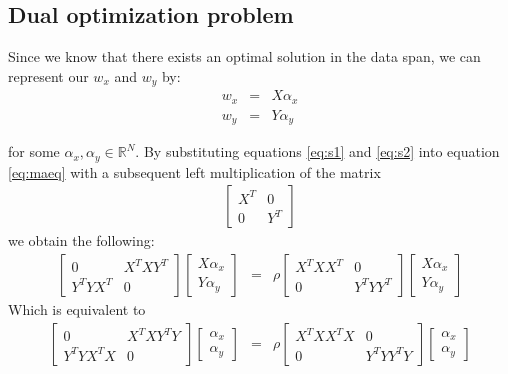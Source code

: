 \documentclass[a4paper, 12pt, titlepage]{article}
\begin{document}
\subsection{Dual optimization problem}
Since we know that there exists an optimal solution in the data span, we can represent our $w_x$ and $w_y$ by:
\begin{eqnarray}
	w_x &=& X\alpha_x \label{eq:s1}\\
	w_y &=& Y\alpha_y \label{eq:s2}
\end{eqnarray}

for some $\alpha_x, \alpha_y \in \mathbb{R}^{N}$.
By substituting equations \eqref{eq:s1} and \eqref{eq:s2} into equation \eqref{eq:maeq} with a subsequent left multiplication of the matrix 
\begin{eqnarray*}
	\begin{bmatrix}
		X^T & 0\\
		0 & Y^T
	\end{bmatrix}
\end{eqnarray*}
we obtain the following:
\begin{eqnarray*}
	\begin{bmatrix}
		0 & X^TXY^T\\
		Y^TYX^T & 0
	\end{bmatrix}
	\begin{bmatrix}
		X\alpha_x\\
		Y\alpha_y
	\end{bmatrix} &=& \rho
	\begin{bmatrix}
		X^T X X^T & 0\\
		0 & Y^T Y Y^T
	\end{bmatrix}
	\begin{bmatrix}
		X\alpha_x\\
		Y\alpha_y
	\end{bmatrix}
\end{eqnarray*}
Which is equivalent to
\begin{eqnarray*}
	\begin{bmatrix}
		0 & X^TXY^TY\\
		Y^TYX^TX & 0
	\end{bmatrix}
	\begin{bmatrix}
		\alpha_x\\
		\alpha_y
	\end{bmatrix} &=& \rho
	\begin{bmatrix}
		X^T X X^T X & 0\\
		0 & Y^T Y Y^T Y
	\end{bmatrix}
	\begin{bmatrix}
		\alpha_x\\
		\alpha_y
	\end{bmatrix}
\end{eqnarray*}
\end{document}
